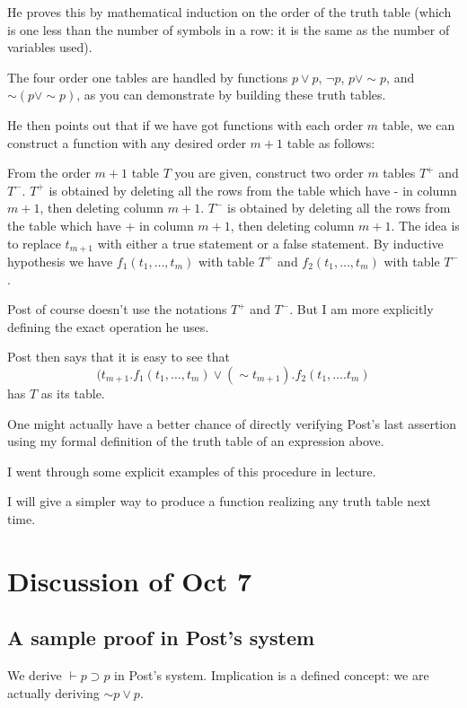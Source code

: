 \documentclass[12pt]{article}
\begin{document}
He proves this by mathematical induction on the order of the truth table (which is one less than the number of symbols in a row:  it is the same as the number of variables used).

The four order one tables are handled by functions $p \vee p$, $\neg p$, $p \vee \sim p$, and $\sim(p \vee \sim p)$, as you can demonstrate by building these truth tables.

He then points out that if we have got functions with each order $m$ table, we can construct a function with any desired order $m+1$ table as follows:

From the order $m+1$ table $T$ you are given, construct two order $m$ tables $T^+$ and $T^-$.  $T^+$ is obtained by deleting all the rows from the table which have
- in column $m+1$, then deleting column $m+1$.  $T^-$ is obtained by deleting all the rows from the table which have
+ in column $m+1$, then deleting column $m+1$.   The idea is to replace $t_{m+1}$ with either a true statement or a false statement.
By inductive hypothesis we have $f_1(t_1,\ldots,t_m)$ with table $T^+$ and $f_2(t_1,\ldots,t_m)$ with table $T^-$.

Post of course doesn't use the notations $T^+$ and $T^-$.  But I am more explicitly defining the exact operation he uses.

Post then says that it is easy to see that $$(t_{m+1}.f_1(t_1,\ldots,t_m) \vee (\sim t_{m+1}).f_2(t_1,\ldots.t_m)$$ has $T$ as its table.

One might actually have a better chance of directly verifying Post's last assertion using my formal definition of the truth table of an expression above.

I went through some explicit examples of this procedure in lecture.

I will give a simpler way to produce a function realizing any truth table next time.

\section{Discussion of Oct 7}

\subsection{A sample proof in Post's system}

We derive $\vdash p \supset p$ in Post's system.  Implication is a defined concept:  we are actually deriving $\sim p \vee p$.
\end{document}
